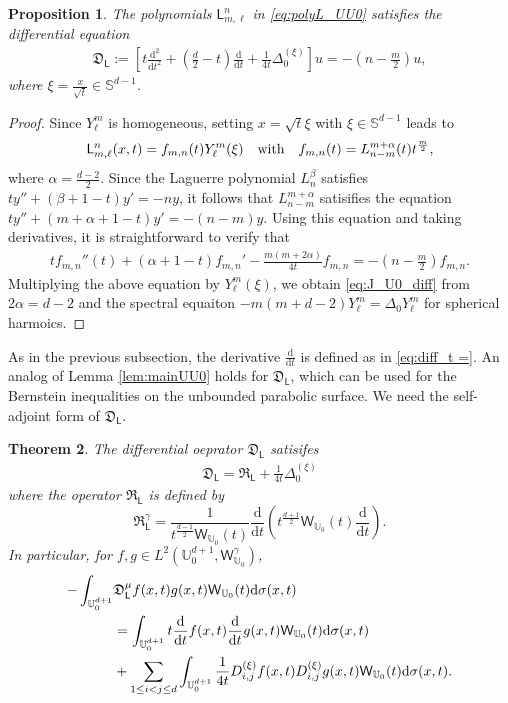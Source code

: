 \documentclass{amsart}
\newtheorem{thm}{Theorem}[section]
\newtheorem{prop}[thm]{Proposition}
\theoremstyle{remark}
\def\d{\mathrm{d}}
\def\sph{{\mathbb{S}^{d-1}}}
\def\sL{{\mathsf L}}
\def\sW{{\mathsf W}}
\def\fD{{\mathfrak D}}
\def\fR{{\mathfrak R}}
\def\a{{\alpha}}
\def\b{{\beta}}
\def\g{{\gamma}}
\def\s{\sigma}
\def\UU{{\mathbb U}}
\def\f{\frac}
\begin{document}
\begin{prop}\label{prp:pdeL}
The polynomials $\sL_{m,\ell}^n$ in \eqref{eq:polyL_UU0} satisfies the differential equation
\begin{align}\label{eq:L_U0_diff}
 \fD_\sL :=  \left[   t \frac{\d^2}{\d t^2} + \left(\tfrac{d}{2} - t \right) \frac{\d}{\d t} + \frac{1}{4 t} \Delta_0^{(\xi)}
    \right] u = - \left(n - \frac m2\right) u,
\end{align}
where $\xi = \frac{x}{\sqrt{t}} \in \sph$. 
\end{prop}

\begin{proof}
Since $Y_\ell^m$ is homogeneous, setting $x = \sqrt{t} \xi$ with $\xi \in \sph$ leads to 
$$
  \sL_{m,\ell}^n (x,t) = f_{m,n}(t) Y_\ell^m(\xi) \quad \hbox{with}\quad f_{m,n}(t) = L_{n-m}^{m +\a}(t) t^{\f{m}{2}},
$$
where $\a = \frac{d-2}{2}$. Since the Laguerre polynomial $L_n^\b$ satisfies $t y'' + (\b+1-t)y' = -n y$, it 
follows that $L_{n-m}^{m+\a}$ satisifies the equation $t y'' + (m+ \a +1 -t) y' = -(n-m) y$. Using this equation
and taking derivatives, it is straightforward to verify that 
\begin{align*}
 t f_{m,n}''(t)  + (\a+1 -t) f_{m,n}' - \frac{m (m+ 2 \a)}{4 t} f_{m,n} = - \left(n - \frac{m}{2}\right) f_{m,n}. 
\end{align*}
Multiplying the above equation by $Y_\ell^m(\xi)$, we obtain \eqref{eq:J_U0_diff} from $2 \a = d-2$ and the
spectral equaiton $- m(m+d-2) Y_\ell^m = \Delta_0 Y_\ell^m$ for spherical harmoics. 
\end{proof}
 
As in the previous subsection, the derivative $\frac{\d}{\d t}$ is defined as in \eqref{eq:diff_t =}. An analog of
Lemma \ref{lem:mainUU0} holds for $\fD_{\sL}$, which can be used for the Bernstein inequalities on the 
unbounded parabolic surface. We need the self-adjoint form of $\fD_{\sL}$. 

\begin{thm} 
The differential oeprator $\fD_{\sL}$ satisifes
\begin{align}\label{eq:L_U0_diff2}
 \fD_{\sL} = \fR_{\sL} + \frac{1}{4 t} \Delta_0^{(\xi)}
\end{align}
where the operator $\fR_\sL$ is defined by
$$
 \fR_{\sL}^\g = \frac1{t^{\f {d-1} 2} \sW_{\UU_0}(t) } \frac{\d}{\d t} \left(t^{\f {d+1}{2}}  \sW_{\UU_0}(t) \frac{\d}{\d t} \right).
$$
In particular, for $f, g  \in L^2\left(\UU_0^{d+1},  \sW_{\UU_0}^\g\right)$, 
\begin{align} \label{eq:int_U01B}
  - \int_{\UU_0^{d+1}} &  \fD_{\sL}^{\mu} f(x,t)  g (x,t)   \sW_{\UU_0}(t) \d \s (x,t) \\
    & =  \int_{\UU_0^{d+1}} t \frac{\d}{\d t} f(x,t) \frac{\d}{\d t} g (x,t)  \sW_{\UU_0}(t) \d \s (x,t) \notag \\ 
    & +  \sum_{1 \le i < j \le d} \int_{\UU_0^{d+1}} \frac{1}{4t} D_{i,j}^{(\xi)} f(x,t) D_{i,j}^{(\xi)} g (x,t) \sW_{\UU_0}(t) \d \s (x,t). 
    \notag
\end{align}
\end{thm}
\end{document}
